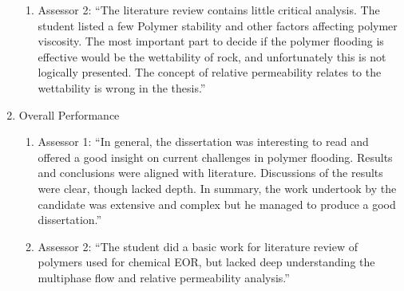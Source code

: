 \documentclass[14pt,twoside]{report}
\begin{document}
\begin{enumerate}
\begin{enumerate}
       \item Assessor 2: ``The literature review contains little critical analysis. The student listed a few Polymer stability and other factors affecting polymer viscosity. The most important part to decide if the polymer flooding is effective would be the wettability of rock, and unfortunately this is not logically presented. The concept of relative permeability relates to the wettability is wrong in the thesis.''
    \end{enumerate}
%  
   \item Overall Performance
    \begin{enumerate}%
       \item Assessor 1: ``In general, the dissertation was interesting to read and offered a good insight on current challenges in polymer flooding. Results and conclusions were aligned with literature. Discussions of the results were clear, though lacked depth. In summary, the work undertook by the candidate was extensive and complex but he managed to produce a good dissertation.''
       \item Assessor 2: ``The student did a basic work for literature review of polymers used for chemical EOR, but lacked deep understanding the multiphase flow and relative permeability analysis.''
    \end{enumerate}
%  
\end{enumerate}

\vfill
\clearpage



\bigskip
\end{document}
